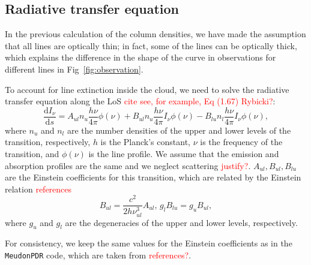 \documentclass[12pt,a4paper]{article}
\newcommand{\fird}[2][]{\frac{\mathrm{d}#1}{\mathrm{d}#2}}
\newcommand{\mdpdr}{\texttt{MeudonPDR} code}
\newcommand{\qt}[1]{\textcolor{red}{#1}}
\begin{document}
\subsection{Radiative transfer equation}
In the previous calculation of the column densities, we have made the assumption that all lines are optically thin; in fact, some of the lines can be optically thick, which explains the difference in the shape of the curve in observations for different lines in Fig~\ref{fig:observation}.

To account for line extinction inside the cloud, we need to solve the radiative transfer equation along the LoS \qt{cite see, for example, Eq (1.67) Rybicki?}:
\begin{equation}
    \fird[I_\nu]{s} = A_{ul} n_u\frac{h\nu}{4\pi}\phi(\nu) +  B_{ul} n_u\frac{h\nu}{4\pi}I_\nu \phi(\nu) -  B_{lu} n_l\frac{h\nu}{4\pi}I_\nu \phi(\nu), \label{eq:rte}
\end{equation}  
where $n_u$ and $n_l$ are the number densities of the upper and lower levels of the transition, respectively, $h$ is the Planck's constant, $\nu$ is the frequency of the transition, and $\phi(\nu)$ is the line profile. We assume that the emission and absorption profiles are the same and we neglect scattering \qt{justify?}. $A_{ul}, B_{ul}, B_{lu}$ are the Einstein coefficients for this transition, which are related by the Einstein relation \qt{references}
\begin{equation}
    B_{ul} = \frac{c^2}{2 h \nu_{ul}^3} A_{ul},\, g_l B_{lu} = g_u B_{ul},
\end{equation}
where $g_u$ and $g_l$ are the degeneracies of the upper and lower levels, respectively.

For consistency, we keep the same values for the Einstein coefficients as in the \mdpdr{}, which are taken from \qt{references?}.
\end{document}
